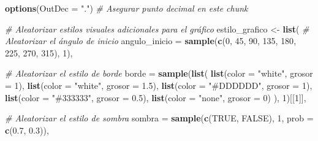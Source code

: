 \documentclass[
]{article}
\newenvironment{Shaded}{\begin{snugshade}}{\end{snugshade}}
\newcommand{\AttributeTok}[1]{\textcolor[rgb]{0.13,0.29,0.53}{#1}}
\newcommand{\CommentTok}[1]{\textcolor[rgb]{0.56,0.35,0.01}{\textit{#1}}}
\newcommand{\ConstantTok}[1]{\textcolor[rgb]{0.56,0.35,0.01}{#1}}
\newcommand{\DecValTok}[1]{\textcolor[rgb]{0.00,0.00,0.81}{#1}}
\newcommand{\FloatTok}[1]{\textcolor[rgb]{0.00,0.00,0.81}{#1}}
\newcommand{\FunctionTok}[1]{\textcolor[rgb]{0.13,0.29,0.53}{\textbf{#1}}}
\newcommand{\NormalTok}[1]{#1}
\newcommand{\OtherTok}[1]{\textcolor[rgb]{0.56,0.35,0.01}{#1}}
\newcommand{\StringTok}[1]{\textcolor[rgb]{0.31,0.60,0.02}{#1}}
\begin{document}
\begin{Shaded}
\begin{Highlighting}[]
\FunctionTok{options}\NormalTok{(}\AttributeTok{OutDec =} \StringTok{"."}\NormalTok{)  }\CommentTok{\# Asegurar punto decimal en este chunk}

\CommentTok{\# Aleatorizar estilos visuales adicionales para el gráfico}
\NormalTok{estilo\_grafico }\OtherTok{\textless{}{-}} \FunctionTok{list}\NormalTok{(}
  \CommentTok{\# Aleatorizar el ángulo de inicio}
  \AttributeTok{angulo\_inicio =} \FunctionTok{sample}\NormalTok{(}\FunctionTok{c}\NormalTok{(}\DecValTok{0}\NormalTok{, }\DecValTok{45}\NormalTok{, }\DecValTok{90}\NormalTok{, }\DecValTok{135}\NormalTok{, }\DecValTok{180}\NormalTok{, }\DecValTok{225}\NormalTok{, }\DecValTok{270}\NormalTok{, }\DecValTok{315}\NormalTok{), }\DecValTok{1}\NormalTok{),}

  \CommentTok{\# Aleatorizar el estilo de borde}
  \AttributeTok{borde =} \FunctionTok{sample}\NormalTok{(}\FunctionTok{list}\NormalTok{(}
    \FunctionTok{list}\NormalTok{(}\AttributeTok{color =} \StringTok{"white"}\NormalTok{, }\AttributeTok{grosor =} \DecValTok{1}\NormalTok{),}
    \FunctionTok{list}\NormalTok{(}\AttributeTok{color =} \StringTok{"white"}\NormalTok{, }\AttributeTok{grosor =} \FloatTok{1.5}\NormalTok{),}
    \FunctionTok{list}\NormalTok{(}\AttributeTok{color =} \StringTok{"\#DDDDDD"}\NormalTok{, }\AttributeTok{grosor =} \DecValTok{1}\NormalTok{),}
    \FunctionTok{list}\NormalTok{(}\AttributeTok{color =} \StringTok{"\#333333"}\NormalTok{, }\AttributeTok{grosor =} \FloatTok{0.5}\NormalTok{),}
    \FunctionTok{list}\NormalTok{(}\AttributeTok{color =} \StringTok{"none"}\NormalTok{, }\AttributeTok{grosor =} \DecValTok{0}\NormalTok{)}
\NormalTok{  ), }\DecValTok{1}\NormalTok{)[[}\DecValTok{1}\NormalTok{]],}

  \CommentTok{\# Aleatorizar el estilo de sombra}
  \AttributeTok{sombra =} \FunctionTok{sample}\NormalTok{(}\FunctionTok{c}\NormalTok{(}\ConstantTok{TRUE}\NormalTok{, }\ConstantTok{FALSE}\NormalTok{), }\DecValTok{1}\NormalTok{, }\AttributeTok{prob =} \FunctionTok{c}\NormalTok{(}\FloatTok{0.7}\NormalTok{, }\FloatTok{0.3}\NormalTok{)),}


\end{Highlighting}
\end{Shaded}
\end{document}
